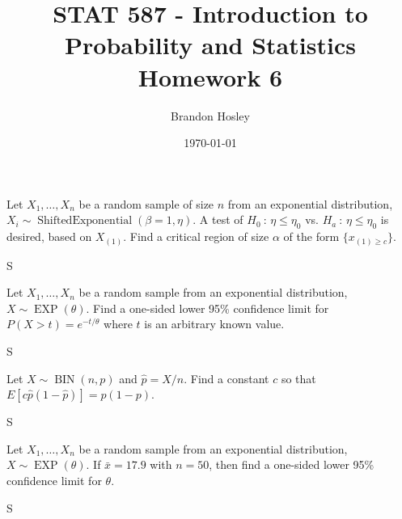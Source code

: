 \documentclass[answers]{exam}
\title{STAT 587 - Introduction to Probability and Statistics%
	\\ Homework 6}
\author{Brandon Hosley}
\date{\today}
\begin{document}
\maketitle
\begin{questions}

\question 
Let \(X_1,\dots,X_n\) be a random sample of size \(n\) from an exponential distribution, 
\(X_i\sim\operatorname{Shifted Exponential}(\beta=1,\eta)\). 
A test of \(H_0\ :\,\eta\leq\eta_0\) vs. \(H_a\ :\,\eta\leq\eta_0\)
is desired, based on \(X_{(1)}\). 
Find a critical region of size \(\alpha\) of the form \(\{x_{(1)\geq c}\}\).
\begin{solution}
	S
\end{solution}

\question 
Let \(X_1,\dots,X_n\) be a random sample from an exponential distribution, 
\(X\sim\operatorname{EXP}(\theta)\). 
Find a one-sided lower 95\% confidence limit for
\(P(X>t)=e^{-t/\theta}\) where \(t\) is an arbitrary known value.

%
% 

\begin{solution}
	S
\end{solution}

\question 
Let \(X\sim\operatorname{BIN}(n,p)\) and \(\hat{p}=X/n\).
Find a constant \(c\) so that
\(E\left[c\hat{p}(1-\hat{p})\right]=p(1-p)\).
\begin{solution}
	S
\end{solution}

\question 
Let \(X_1,\ldots,X_n\) be a random sample from an exponential distribution,
\(X\sim\operatorname{EXP}(\theta)\). 
If \(\bar{x}=17.9\) with \(n=50\), then find a one-sided lower 95\%
confidence limit for \(\theta\).
\begin{solution}
	S
\end{solution}


\end{questions}
\end{document}
